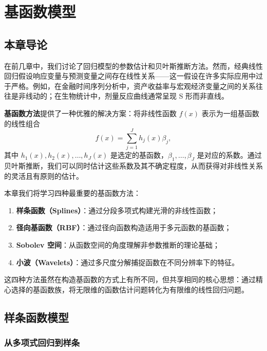 
\chapter{基函数模型}

\section{本章导论}

在前几章中，我们讨论了回归模型的参数估计和贝叶斯推断方法。然而，经典线性回归假设响应变量与预测变量之间存在线性关系——这一假设在许多实际应用中过于严格。例如，在金融时间序列分析中，资产收益率与宏观经济变量之间的关系往往是非线动的；在生物统计中，剂量反应曲线通常呈现 S 形而非直线。

\textbf{基函数方法}提供了一种优雅的解决方案：将非线性函数 $f(x)$ 表示为一组基函数的线性组合
\begin{equation}
f(x) = \sum_{j=1}^{J} h_j(x) \beta_j,
\label{eq:basis-function-decomposition}
\end{equation}
其中 $h_1(x), h_2(x), \ldots, h_J(x)$ 是选定的基函数，$\beta_1, \ldots, \beta_J$ 是对应的系数。通过贝叶斯推断，我们可以同时估计这些系数及其不确定程度，从而获得对非线性关系的灵活且有原则的估计。

本章我们将学习四种最重要的基函数方法：
\begin{enumerate}
\item \textbf{样条函数（Splines）}：通过分段多项式构建光滑的非线性函数；
\item \textbf{径向基函数（RBF）}：通过径向函数构造适用于多元函数的基函数；
\item \textbf{Sobolev 空间}：从函数空间的角度理解非参数推断的理论基础；
\item \textbf{小波（Wavelets）}：通过多尺度分解捕捉函数在不同分辨率下的特征。
\end{enumerate}

这四种方法虽然在构造基函数的方式上有所不同，但共享相同的核心思想：通过精心选择的基函数族，将无限维的函数估计问题转化为有限维的线性回归问题。

\section{样条函数模型}\label{sec:spline-models}

\subsection{从多项式回归到样条}

